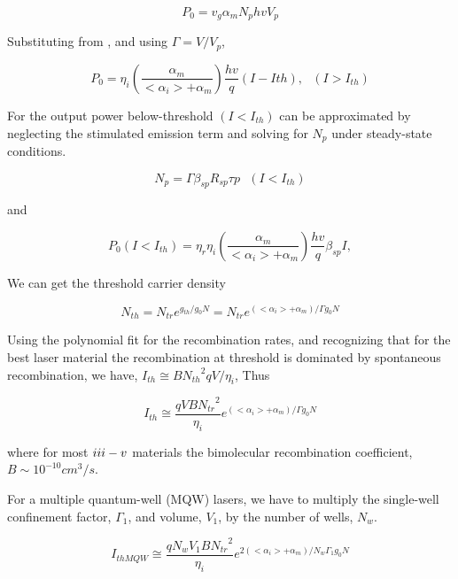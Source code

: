 \begin{equation}
  P_0 = v_g\alpha_{m}N_phvV_p
\end{equation}

Substituting from , and using $\Gamma = V/V_p$,

\begin{equation}
  P_0 = \eta_i(\frac{\alpha_m}{<\alpha_i> + \alpha_m})\frac{hv}{q}(I - I{th}),~~~(I > I_{th})
\end{equation}

For the output power below-threshold $(I < I_{th})$ can be approximated by neglecting the stimulated emission term and solving for $N_p$ under steady-state conditions.

\begin{equation}
N_p = \Gamma\beta_{sp}R_{sp}\tau{p}~~~(I < I_{th})
\end{equation}

and 

\begin{equation}
  P_0(I < I_{th}) = \eta_r\eta_i\left(\frac{\alpha_m}{<\alpha_i> + \alpha_m}\right)\frac{hv}{q}\beta_{sp}I,
\end{equation}


We can get the threshold carrier density

\begin{equation}
  N_{th} = N_{tr}e^{g_{th}/g_{0}N} = N_{tr}e^{(<\alpha_i> + \alpha_m)/\Gamma{g_{0}}N}
\end{equation}

Using the polynomial fit for the recombination rates, and recognizing that for
the best laser material the recombination at threshold is dominated by
spontaneous recombination, we have, $I_{th}\cong B{N_{th}}^2qV/\eta_i$, Thus

\begin{equation}
  I_{th} {\cong} \frac{qVB{N_{tr}}^2}{\eta_i}e^{(<\alpha_i> + \alpha_m)/\Gamma{g_0}N}
\end{equation}

where for most $\uppercase\expandafter{\romannumeral3} -
\uppercase\expandafter{\romannumeral5}$ materials the bimolecular recombination
coefficient, $B \sim 10^{-10} cm^3/s$.

For a multiple quantum-well (MQW) lasers, we have to multiply the single-well confinement factor, $\Gamma_1$, and volume, $V_1$, by the number of wells, $N_w$.


\begin{equation}
  I_{thMQW} {\cong} \frac{qN_{w}V_{1}B{N_{tr}}^2}{\eta_i}e^{2(<\alpha_i> + \alpha_m)/{N_w\Gamma_{1}g_{0}N}}
\end{equation}



